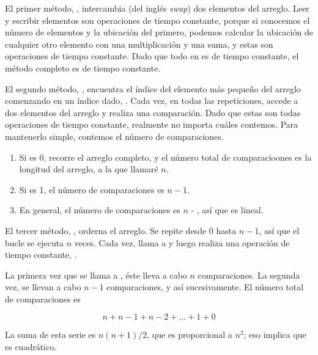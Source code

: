 \documentclass[12pt]{book}
\theoremstyle{exercise}
\begin{document}
El primer método, , intercambia (del inglés \emph{swap}) dos elementos del
arreglo. Leer y escribir elementos son operaciones de tiempo constante,
porque si conocemos el número de elementos y la ubicación del primero,
podemos calcular la ubicación de cualquier otro elemento con una multiplicación
y una suma, y estas son operaciones de tiempo constante. Dado que todo en
 es de tiempo constante, el método completo es de tiempo constante.

El segundo método, , encuentra el índice del elemento más
pequeño del arreglo comenzando en un índice dado, . Cada vez,
en todas las repeticiones, accede a dos elementos del arreglo y
realiza una comparación. Dado que estas son todas operaciones de tiempo
constante, realmente no importa cuáles contemos. Para mantenerlo simple,
contemos el número de comparaciones.

\begin{enumerate}

\item Si  es 0,  recorre el arreglo
  completo, y el número total de comparacioones es la longitud del
  arreglo, a la que llamaré $n$.

\item Si  es 1, el número de comparaciones es $n-1$.

\item En general, el número de comparaciones es $n$ - , así que 
   es lineal.

\end{enumerate}

El tercer método, , orderna el arreglo. Se repite desde
0 hasta $n-1$, así que el bucle se ejecuta $n$ veces. Cada vez, llama
a  y luego realiza una operación de tiempo constante,
.


La primera vez que se llama a , éste lleva
a cabo $n$ comparaciones. La segunda vez, se llevan a cabo
$n-1$ comparaciones, y así sucesivamente. El número total de comparaciones es

\[ n + n-1 + n-2 + ... + 1 + 0 \]

La suma de esta serie es $n(n+1)/2$, que es proporcional a
$n^2$; eso implica que  es cuadrático.

\end{document}
